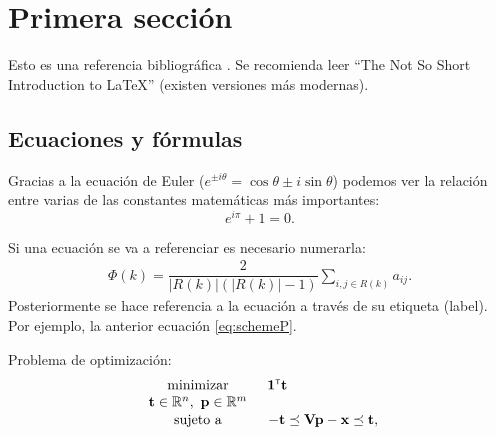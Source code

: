 \section{Primera sección}

Esto es una referencia bibliográfica \cite{bibex}. Se recomienda leer ``The Not So Short Introduction to \LaTeX'' \cite{Oetiker2007} (existen versiones más modernas).


\subsection{Ecuaciones y fórmulas}

Gracias a la ecuación de Euler ($e^{ \pm i\theta } = \cos \theta \pm i\sin \theta$) podemos ver la relación entre varias de las constantes matemáticas más importantes:
\[
    e^{i\pi} + 1 = 0.
\]


Si una ecuación se va a referenciar es necesario numerarla:
\begin{eqnarray}
\label{eq:schemeP}
 \Phi (k)=\dfrac{2}{|R(k)|(|R(k)|-1)} \underset{i,j \in R(k)}{\sum} a_{ij}.
\end{eqnarray}
Posteriormente se hace referencia a la ecuación a través de su etiqueta (label). Por ejemplo, la anterior ecuación \eqref{eq:schemeP}.



Problema de optimización:
\begin{equation}\label{eq:LP1}
\begin{array}{cl}
  \displaystyle \begin{array}{c}\mathrm{minimizar} \\ \mathbf{t} \in \mathbb{R}^{n}, \  \mathbf{p} \in \mathbb{R}^{m} \end{array} & \hspace{-0.2cm} \begin{array}{c} \mathbf{1}^{\transpuesta}\mathbf{t} \\ \mbox{} \end{array}  \\
  & \vspace{-0.4cm} \\ %
  \mbox{sujeto a} & -\mathbf{t} \preceq  \mathbf{V}\mathbf{p} - \mathbf{x}  \preceq  \mathbf{t},\\
 \end{array}
\end{equation}




